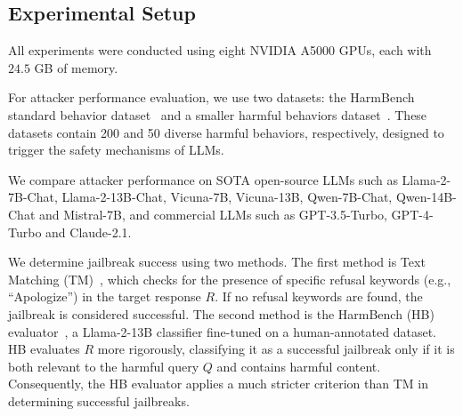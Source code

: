 \subsection{Experimental Setup} \label{sec:exp_setup}
 
All experiments were conducted using eight NVIDIA A5000 GPUs, each with $24.5$ GB of memory.

 For attacker performance evaluation, we use two datasets: the HarmBench standard behavior dataset~\citep{mazeika_harmbench_2024} and a smaller harmful behaviors dataset~\citep{chao_jailbreaking_2024}. These datasets contain 200 and 50 diverse harmful behaviors, respectively, designed to trigger the safety mechanisms of LLMs.

 We compare attacker performance  on SOTA open-source LLMs such as Llama-2-7B-Chat, Llama-2-13B-Chat, Vicuna-7B, Vicuna-13B, Qwen-7B-Chat, Qwen-14B-Chat and Mistral-7B, and commercial LLMs such as GPT-3.5-Turbo, GPT-4-Turbo and Claude-2.1. 

 We determine jailbreak success using two methods. The first method is Text Matching (TM)~\cite{zou_universal_2023}, which checks for the presence of specific refusal keywords (e.g., ``Apologize'') in the target response $R$. If no refusal keywords are found, the jailbreak is considered successful. The second method is the HarmBench (HB) evaluator~\citep{mazeika_harmbench_2024}, a Llama-2-13B classifier fine-tuned on a human-annotated dataset. HB evaluates $R$ more rigorously, classifying it as a successful jailbreak only if it is both relevant to the harmful query $Q$ and contains harmful content. Consequently, the HB evaluator applies a much stricter criterion than TM in determining successful jailbreaks.



